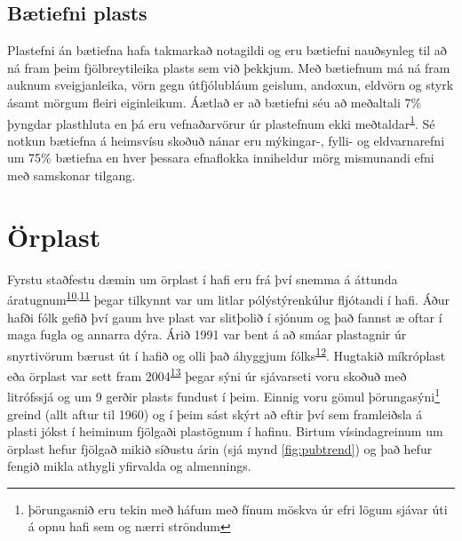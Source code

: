 \documentclass[icelandic,]{book}
\let\rmarkdownfootnote\footnote%
\def\footnote{\protect\rmarkdownfootnote}
\begin{document}
\hypertarget{btiefni-plasts}{%
\section*{Bætiefni plasts}\label{btiefni-plasts}}

Plastefni án bætiefna hafa takmarkað notagildi og eru bætiefni nauðsynleg til að ná fram þeim fjölbreytileika plasts sem við þekkjum. Með bætiefnum má ná fram auknum sveigjanleika, vörn gegn útfjólubláum geislum, andoxun, eldvörn og styrk ásamt mörgum fleiri eiginleikum. Áætlað er að bætiefni séu að meðaltali 7\% þyngdar plasthluta en þá eru vefnaðarvörur úr plastefnum ekki meðtaldar\textsuperscript{\protect\hyperlink{ref-geyer2017production}{1}}. Sé notkun bætiefna á heimsvísu skoðuð nánar eru mýkingar-, fylli- og eldvarnarefni um 75\% bætiefna en hver þessara efnaflokka inniheldur mörg mismunandi efni með samskonar tilgang.

\hypertarget{orplast}{%
\chapter{Örplast}\label{orplast}}

Fyrstu staðfestu dæmin um örplast í hafi eru frá því snemma á áttunda áratugnum\textsuperscript{\protect\hyperlink{ref-Waters1972}{10},\protect\hyperlink{ref-Colton1974}{11}} þegar tilkynnt var um litlar pólýstýrenkúlur fljótandi í hafi. Áður hafði fólk gefið því gaum hve plast var slitþolið í sjónum og það fannst æ oftar í maga fugla og annarra dýra. Árið 1991 var bent á að smáar plastagnir úr snyrtivörum bærust út í hafið og olli það áhyggjum fólks\textsuperscript{\protect\hyperlink{ref-zitko1991another}{12}}. Hugtakið míkróplast eða örplast var sett fram 2004\textsuperscript{\protect\hyperlink{ref-Thompson2004lost}{13}} þegar sýni úr sjávarseti voru skoðuð með litrófssjá og um 9 gerðir plasts fundust í þeim. Einnig voru gömul þörungasýni\footnote{þörungasnið eru tekin með háfum með fínum möskva úr efri lögum sjávar úti á opnu hafi sem og nærri ströndum} greind (allt aftur til 1960) og í þeim sást skýrt að eftir því sem framleiðsla á plasti jókst í heiminum fjölgaði plastögnum í hafinu. Birtum vísindagreinum um örplast hefur fjölgað mikið síðustu árin (sjá mynd \ref{fig:pubtrend}) og það hefur fengið mikla athygli yfirvalda og almennings.
\end{document}
